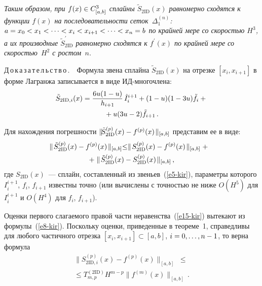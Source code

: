 \begin{multicols}{2}
  \textit{Таким образом, при $f(x)\hm\in C^3_{[a,b]}$ сплайны 
$\tilde{S}_{2\mathrm{ID}}(x)$ равномерно сходятся к функции $f(x)$ на 
последовательности сеток~$\Delta_1^{(n)}$: $a\hm=x_0\hm<x_1<\cdots < 
x_i\hm< x_{i+1}<\cdots <x_n\hm=b$ по крайней мере со скоростью $H^3$, а их 
производные $\tilde{S}^\prime_{2\mathrm{ID}}$ равномерно сходятся к $f^\prime(x)$ по 
крайней мере со скоростью~$H^2$ с ростом~$n$.}
  
  \medskip
  
  \noindent
  Д\,о\,к\,а\,з\,а\,т\,е\,л\,ь\,с\,т\,в\,о\,.\ \ Формула звена сплайна 
$\tilde{S}_{2\mathrm{ID}}(x)$ на отрезке $[x_i,x_{i+1}]$ в форме Лагранжа записывается 
в виде ИД-мно\-го\-чле\-на: 
  \begin{multline*}
  \tilde{S}_{2\mathrm{ID},i}(x) = \displaystyle\frac{\displaystyle 6u(1-u)\mathstrut}{\displaystyle h_{i+1}\mathstrut}\,\hat{I}_i^{i+1}+(1-u) (1-3u)\tilde{f}_i 
+{}\\
{}+u(3u-2)\tilde{f}_{i+1}\,.
\end{multline*}
  
  Для нахождения погрешности $\parallel \!\!\!\tilde{S}_{2\mathrm{ID}}^{(p)}(x)\hm- 
f^{(p)}(x)\!\parallel_{[a,b]}$ представим ее в виде:
  \begin{multline}
  \hspace*{-3mm}\parallel\! \tilde{S}_{2\mathrm{ID}}^{(p)} (x) -f^{(p)}(x)\!\parallel_{[a,b]}
  \leq \parallel \!
S_{2\mathrm{ID}}^{(p)}(x) -f^{(p)}(x)\!\parallel_{[a,b]}+{}\\
{}+ \parallel\! \tilde{S}^{(p)}_{2\mathrm{ID}}(x) -
S_{2\mathrm{ID}}^{(p)}(x)\!\parallel_{[a,b]}\,,
  \label{e15-kir}
  \end{multline}
где $S_{2\mathrm{ID}}(x)$~--- сплайн, составленный из звеньев~(\ref{e5-kir}), параметры 
которого $I_i^{i+1}$, $f_i$, $f_{i+1}$ известны точно (или вычислены с 
точностью не ниже $O(H^5)$ для $I_i^{i+1}$ и $O(H^4)$ для $f_i$, $f_{i+1}$).

  Оценки первого слагаемого правой части неравенства~(\ref{e15-kir}) 
вытекают из формулы~(\ref{e8-kir}). Поскольку оценки, приведенные в 
теореме~1, справедливы для любого частичного отрезка $[x_i,x_{i+1}]\subset 
[a,b]$, $i\hm=0,\ldots , n-1$, то верна формула
  \begin{multline}
  \parallel\! S^{(p)}_{2\mathrm{ID},i}(x) -f^{(p)}(x)\!\parallel_{[a,b]} \;\leq {}\\
  {}\leq T^{(2\mathrm{ID})}_{m,p} 
H^{m-p}\parallel\! f^{(m)}(x)\!\parallel_{[a,b]}\,.
  \label{e16-kir}
  \end{multline}
  

\end{multicols}
